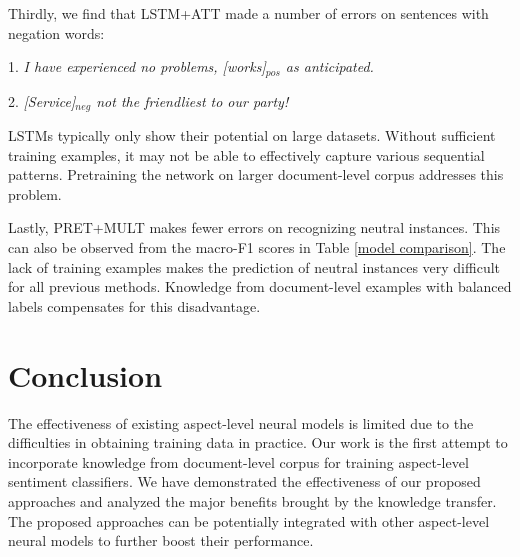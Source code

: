 \documentclass[11pt,a4paper]{article}
\begin{document}
Thirdly, we find that LSTM+ATT made a number of errors on sentences with negation words:

1. \emph{I have experienced no problems, [works]$_{pos}$ as anticipated.}

2. \emph{[Service]$_{neg}$ not the friendliest to our party!}

LSTMs typically only show their potential on large datasets. Without sufficient training examples, it may not be able to effectively capture various sequential patterns. Pretraining the network on larger document-level corpus addresses this problem.

Lastly, PRET+MULT makes fewer errors on recognizing neutral instances. This can also be observed from the macro-F1 scores in Table \ref{model comparison}. The lack of training examples makes the prediction of neutral instances very difficult for all previous methods. Knowledge from document-level examples with balanced labels compensates for this disadvantage.


\section{Conclusion}
The effectiveness of existing aspect-level neural models is limited due to the difficulties in obtaining training data in practice.
Our work is the first attempt to incorporate knowledge from document-level corpus for training aspect-level sentiment classifiers. We have demonstrated the effectiveness of our proposed approaches and analyzed the major benefits brought by the knowledge transfer. 
The proposed approaches can be potentially integrated with other aspect-level neural models to further boost their performance.



\end{document}
